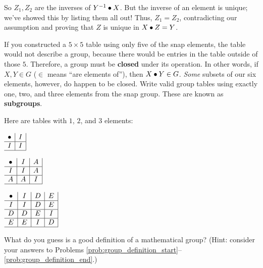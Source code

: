 \documentclass[../gatm_answers.tex]{subfiles}
\begin{document}
So $Z_1,Z_2$ are the inverses of $Y^{-1}\bullet X$. But the inverse of an element is unique; we've showed this by listing them all out! Thus, $Z_1=Z_2$, contradicting our assumption and proving that $Z$ is unique in $X\bullet Z = Y$.

\begin{outer_problem}
	\item If you constructed a $5\times 5$ table using only five of the snap elements, the table would not describe a group, because there would be entries in the table outside of those $5$. Therefore, a group must be \textbf{closed} under its operation. In other words, if $X,Y\in G$ ($\in$ means ``are elements of''), then $X\bullet Y\in G$. \textit{Some} subsets of our six elements, however, do happen to be closed. Write valid group tables using exactly one, two, and three elements from the snap group. These are known as \textbf{subgroups}.\label{prob:group_definition_end}
\end{outer_problem}

Here are tables with $1$, $2$, and $3$ elements:

\begin{minipage}{0.3\textwidth}
$\begin{array}{c|c|}
\bullet & I \\ \hline
I & I \\ \hline
\end{array}$
\end{minipage}\hfill
\begin{minipage}{0.3\textwidth}
$\begin{array}{c|c|c|}
\bullet & I & A \\ \hline
I & I & A \\ \hline
A & A & I \\ \hline
\end{array}$
\end{minipage}\hfill
\begin{minipage}{0.3\textwidth}
$\begin{array}{c|c|c|c|}
\bullet & I & D & E \\ \hline
I & I & D & E \\ \hline
D & D & E & I \\ \hline
E & E & I & D \\ \hline
\end{array}$
\end{minipage}

\begin{outer_problem}
	\item What do you guess is a good definition of a mathematical group? (Hint: consider your answers to Problems \ref{prob:group_definition_start}--\ref{prob:group_definition_end}.)
\end{outer_problem}
\end{document}
